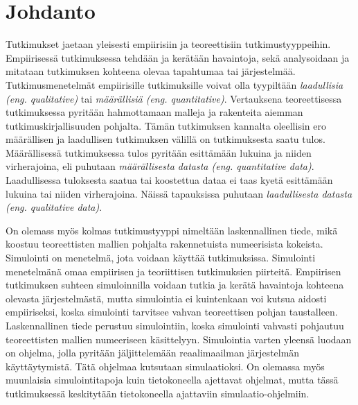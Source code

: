 \documentclass[utf8]{gradu3}
\begin{document}
\author{Jaakko Palm}

\maketitle

\mainmatter

\chapter{Johdanto} \label{johdanto}
Tutkimukset jaetaan yleisesti empiirisiin ja teoreettisiin tutkimustyyppeihin.
Empiirisessä tutkimuksessa tehdään ja kerätään havaintoja, sekä analysoidaan 
ja mitataan tutkimuksen kohteena olevaa tapahtumaa tai järjestelmää. 
Tutkimusmenetelmät empiirisille tutkimuksille voivat olla 
tyypiltään \textit{laadullisia (eng. qualitative)} 
tai \textit{määrällisiä (eng. quantitative)}. 
Vertauksena teoreettisessa tutkimuksessa pyritään hahmottamaan 
malleja ja rakenteita aiemman tutkimuskirjallisuuden pohjalta. 
Tämän tutkimuksen kannalta oleellisin ero määrällisen ja laadullisen tutkimuksen 
välillä on tutkimuksesta saatu tulos.
Määrällisessä tutkimuksessa tulos pyritään esittämään lukuina ja niiden virherajoina,
eli puhutaan \textit{määrällisesta datasta (eng. quantitative data)}. 
Laadullisessa tuloksesta saatua tai koostettua dataa ei taas kyetä esittämään 
lukuina tai niiden virherajoina. Näissä tapauksissa puhutaan 
\textit{laadullisesta datasta (eng. qualitative data)}.

On olemass myös kolmas tutkimustyyppi nimeltään laskennallinen tiede, 
mikä koostuu teoreettisten mallien pohjalta rakennetuista numeerisista kokeista. 
Simulointi on menetelmä, jota voidaan käyttää tutkimuksissa.
Simulointi menetelmänä omaa empiirisen ja teoriittisen tutkimuksien piirteitä.
Empiirisen tutkimuksen suhteen simuloinnilla voidaan tutkia ja kerätä havaintoja
kohteena olevasta järjestelmästä, mutta simulointia ei 
kuintenkaan voi kutsua aidosti empiiriseksi,
koska simulointi tarvitsee vahvan teoreettisen pohjan taustalleen.
Laskennallinen tiede perustuu simulointiin, 
koska simulointi vahvasti pohjautuu teoreettisten mallien numeeriseen käsittelyyn.
Simulointia varten yleensä luodaan on ohjelma, 
jolla pyritään jäljittelemään reaalimaailman järjestelmän käyttäytymistä.
Tätä ohjelmaa kutsutaan simulaatioksi.
On olemassa myös muunlaisia simulointitapoja kuin tietokoneella ajettavat ohjelmat, mutta 
tässä tutkimuksessä keskitytään tietokoneella ajattaviin simulaatio-ohjelmiin.
\end{document}
